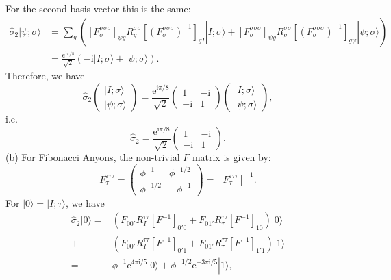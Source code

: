 \documentclass{book}
\begin{document}
For the second basis vector this is the same:
\begin{equation*}
\begin{aligned}
\hat{\sigma }_{2} |\psi ;\sigma \rangle  & =\sum _{g} ([F_{\sigma }^{\sigma \sigma \sigma } ]_{\psi g} R_{g}^{\sigma \sigma } [(F_{\sigma }^{\sigma \sigma \sigma } )^{-1} ]_{gI} |I;\sigma \rangle +[F_{\sigma }^{\sigma \sigma \sigma } ]_{\psi g} R_{g}^{\sigma \sigma } [(F_{\sigma }^{\sigma \sigma \sigma } )^{-1} ]_{g\psi } |\psi ;\sigma \rangle )\\
 & =\frac{\mathrm{e}^{\mathrm{i} \pi /8}}{\sqrt{2}} (-\mathrm{i} |I;\sigma \rangle +|\psi ;\sigma \rangle ).
\end{aligned}
\end{equation*}
Therefore, we have
\begin{equation*}
\hat{\sigma }_{2}\begin{pmatrix}
|I;\sigma \rangle \\
|\psi ;\sigma \rangle 
\end{pmatrix} =\frac{\mathrm{e}^{\mathrm{i} \pi /8}}{\sqrt{2}}\begin{pmatrix}
1 & -\mathrm{i}\\
-\mathrm{i} & 1
\end{pmatrix}\begin{pmatrix}
|I;\sigma \rangle \\
|\psi ;\sigma \rangle 
\end{pmatrix} ,
\end{equation*}
i.e.
\begin{equation*}
\hat{\sigma }_{2} =\frac{\mathrm{e}^{\mathrm{i} \pi /8}}{\sqrt{2}}\begin{pmatrix}
1 & -\mathrm{i}\\
-\mathrm{i} & 1
\end{pmatrix} .
\end{equation*}
(b) For Fibonacci Anyons, the non-trivial $F$ matrix is given by:
\begin{equation*}
F_{\tau }^{\tau \tau \tau } =\begin{pmatrix}
\phi ^{-1} & \phi ^{-1/2}\\
\phi ^{-1/2} & -\phi ^{-1}
\end{pmatrix} =[F_{\tau }^{\tau \tau \tau } ]^{-1} .
\end{equation*}
For $|0 \rangle =|I;\tau \rangle $, we have
\begin{equation*}
\begin{aligned}
\hat{\sigma }_{2} |0 \rangle = & (F_{00'} R_{I}^{\tau \tau } [F^{-1} ]_{0'0} +F_{01'} R_{\tau }^{\tau \tau } [F^{-1} ]_{10} )|0\rangle \\
+ & (F_{00'} R_{I}^{\tau \tau } [F^{-1} ]_{0'1} +F_{01'} R_{\tau }^{\tau \tau } [F^{-1} ]_{1'1} )|1\rangle \\
= & \phi ^{-1}\mathrm{e}^{4\pi \mathrm{i} /5} |0\rangle +\phi ^{-1/2}\mathrm{e}^{-3\pi \mathrm{i} /5} |1 \rangle ,
\end{aligned}
\end{equation*}
\end{document}
